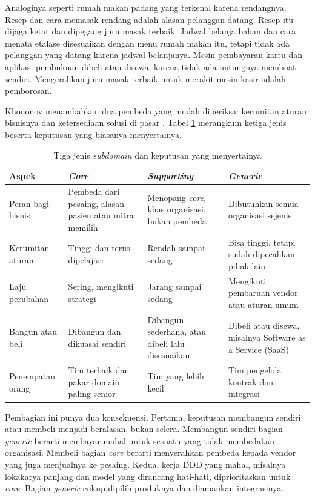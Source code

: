 Analoginya seperti rumah makan padang yang terkenal karena rendangnya. Resep dan cara memasak
rendang adalah alasan pelanggan datang. Resep itu dijaga ketat dan dipegang juru masak terbaik.
Jadwal belanja bahan dan cara menata etalase disesuaikan dengan menu rumah makan itu, tetapi tidak
ada pelanggan yang datang karena jadwal belanjanya. Mesin pembayaran kartu dan aplikasi pembukuan
dibeli atau disewa, karena tidak ada untungnya membuat sendiri. Mengerahkan juru masak terbaik untuk
merakit mesin kasir adalah pemborosan.

Khononov menambahkan dua pembeda yang mudah diperiksa: kerumitan aturan bisnisnya dan ketersediaan
solusi di pasar \cite{c06-khononov2021}. Tabel \ref{tab:ch06-jenis-subdomain} merangkum ketiga
jenis beserta keputusan yang biasanya menyertainya.

\begin{table}[!htb]
  \centering
  \caption{Tiga jenis \textit{subdomain} dan keputusan yang menyertainya}
  \label{tab:ch06-jenis-subdomain}
  \footnotesize
  \begin{tabularx}{\textwidth}{>{\raggedright\arraybackslash}p{2.2cm} >{\raggedright\arraybackslash}X >{\raggedright\arraybackslash}X >{\raggedright\arraybackslash}X}
    \hline
    \textbf{Aspek} & \textbf{\textit{Core}} & \textbf{\textit{Supporting}} & \textbf{\textit{Generic}}
      \\ \hline
    Peran bagi bisnis & Pembeda dari pesaing, alasan pasien atau mitra memilih & Menopang
      \textit{core}, khas organisasi, bukan pembeda & Dibutuhkan semua organisasi sejenis \\ \hline
    Kerumitan aturan & Tinggi dan terus dipelajari & Rendah sampai sedang & Bisa tinggi, tetapi
      sudah dipecahkan pihak lain \\ \hline
    Laju perubahan & Sering, mengikuti strategi & Jarang sampai sedang & Mengikuti pembaruan vendor
      atau aturan umum \\ \hline
    Bangun atau beli & Dibangun dan dikuasai sendiri & Dibangun sederhana, atau dibeli lalu
      disesuaikan & Dibeli atau disewa, misalnya Software as a Service (SaaS) \\ \hline
    Penempatan orang & Tim terbaik dan pakar domain paling senior & Tim yang lebih kecil & Tim
      pengelola kontrak dan integrasi \\ \hline
  \end{tabularx}
\end{table}

Pembagian ini punya dua konsekuensi. Pertama, keputusan membangun sendiri atau membeli menjadi
beralasan, bukan selera. Membangun sendiri bagian \textit{generic} berarti membayar mahal untuk
sesuatu yang tidak membedakan organisasi. Membeli bagian \textit{core} berarti menyerahkan pembeda
kepada vendor yang juga menjualnya ke pesaing. Kedua, kerja DDD yang mahal, misalnya lokakarya
panjang dan model yang dirancang hati-hati, diprioritaskan untuk \textit{core}. Bagian
\textit{generic} cukup dipilih produknya dan diamankan integrasinya.

